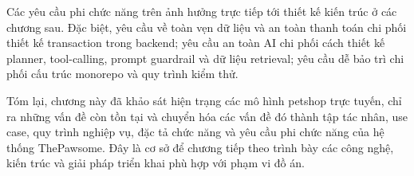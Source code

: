 \documentclass[../DoAn.tex]{subfiles}
\begin{document}
Các yêu cầu phi chức năng trên ảnh hưởng trực tiếp tới thiết kế kiến trúc ở các chương sau. Đặc biệt, yêu cầu về toàn vẹn dữ liệu và an toàn thanh toán chi phối thiết kế transaction trong backend; yêu cầu an toàn AI chi phối cách thiết kế planner, tool-calling, prompt guardrail và dữ liệu retrieval; yêu cầu dễ bảo trì chi phối cấu trúc monorepo và quy trình kiểm thử.

Tóm lại, chương này đã khảo sát hiện trạng các mô hình petshop trực tuyến, chỉ ra những vấn đề còn tồn tại và chuyển hóa các vấn đề đó thành tập tác nhân, use case, quy trình nghiệp vụ, đặc tả chức năng và yêu cầu phi chức năng của hệ thống ThePawsome. Đây là cơ sở để chương tiếp theo trình bày các công nghệ, kiến trúc và giải pháp triển khai phù hợp với phạm vi đồ án.


\flushbottom
\end{document}
